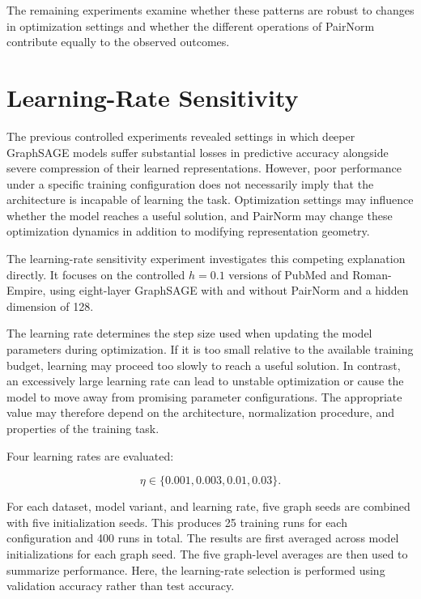 \documentclass[english]{lni}
\begin{document}
The remaining experiments examine whether these patterns are robust to changes in optimization settings and whether the different operations of PairNorm contribute equally to the observed outcomes.






\section{Learning-Rate Sensitivity}
\label{sec:lr-sensitivity}

The previous controlled experiments revealed settings in which deeper GraphSAGE models suffer substantial losses in predictive accuracy alongside severe compression of their learned representations. However, poor performance under a specific training configuration does not necessarily imply that the architecture is incapable of learning the task. Optimization settings may influence whether the model reaches a useful solution, and PairNorm may change these optimization dynamics in addition to modifying representation geometry.

The learning-rate sensitivity experiment investigates this competing explanation directly. It focuses on the controlled $h=0.1$ versions of PubMed and Roman-Empire, using eight-layer GraphSAGE with and without PairNorm and a hidden dimension of 128.

The learning rate determines the step size used when updating the model parameters during optimization. If it is too small relative to the available training budget, learning may proceed too slowly to reach a useful solution. In contrast, an excessively large learning rate can lead to unstable optimization or cause the model to move away from promising parameter configurations. The appropriate value may therefore depend on the architecture, normalization procedure, and properties of the training task.

Four learning rates are evaluated:

\[
\eta\in\{0.001,0.003,0.01,0.03\}.
\]

For each dataset, model variant, and learning rate, five graph seeds are combined with five initialization seeds. This produces 25 training runs for each configuration and 400 runs in total. The results are first averaged across model initializations for each graph seed. The five graph-level averages are then used to summarize performance. Here, the learning-rate selection is performed using validation accuracy rather than test accuracy.
\end{document}
